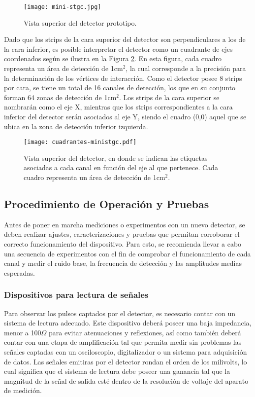 	\begin{figure}[h]
		\centering
		\texttt{[image: mini-stgc.jpg]}
		\caption{Vista superior del detector prototipo.}
		\label{img:foto-mini-stgc}
	\end{figure}	
	
	Dado que los strips de la cara superior del detector son perpendiculares a los de la cara inferior, es posible interpretar el detector como un cuadrante de ejes coordenados según se ilustra en la Figura \ref{img:cuadrantes-ministgc}. En esta figura, cada cuadro representa un área de detección de 1cm$^2$, la cual corresponde a la precisión para la determinación de los vértices de interacción. Como el detector posee 8 strips por cara, se tiene un total de 16 canales de detección, los que en su conjunto forman 64 zonas de detección de 1cm$^2$. Los strips de la cara superior se nombrarán como el eje X, mientras que los strips correspondientes a la cara inferior del detector serán asociados al eje Y, siendo el cuadro (0,0) aquel que se ubica en la zona de detección inferior izquierda.
	
	\begin{figure}[h]
		\centering
		\texttt{[image: cuadrantes-ministgc.pdf]}
		\caption{Vista superior del detector, en donde se indican las etiquetas asociadas a cada canal en función del eje al que pertenece. Cada cuadro representa un área de detección de 1cm$^2$.}
		\label{img:cuadrantes-ministgc}
	\end{figure}

\subsection{Procedimiento de Operación y Pruebas}
	Antes de poner en marcha mediciones o experimentos con un nuevo detector, se deben realizar ajustes, caracterizaciones y pruebas que permitan corroborar el correcto funcionamiento del dispositivo. Para esto, se recomienda llevar a cabo una secuencia de experimentos con el fin de comprobar el funcionamiento de cada canal y medir el ruido base, la frecuencia de detección y las amplitudes medias esperadas.

	\subsubsection{Dispositivos para lectura de señales}
		Para observar los pulsos captados por el detector, es necesario contar con un sistema de lectura adecuado. Este dispositivo deberá poseer una  baja impedancia, menor a 100$\Omega$ para evitar atenuaciones y reflexiones, así como también deberá contar con una etapa de amplificación tal que permita medir sin problemas las señales captadas con un osciloscopio, digitalizador o un sistema para adquisición de datos. Las señales emitiras por el detector rondan el orden de los milivolts, lo cual significa que el sistema de lectura debe poseer una ganancia tal que la magnitud de la señal de salida esté dentro de la resolución de voltaje del aparato de medición.
		
